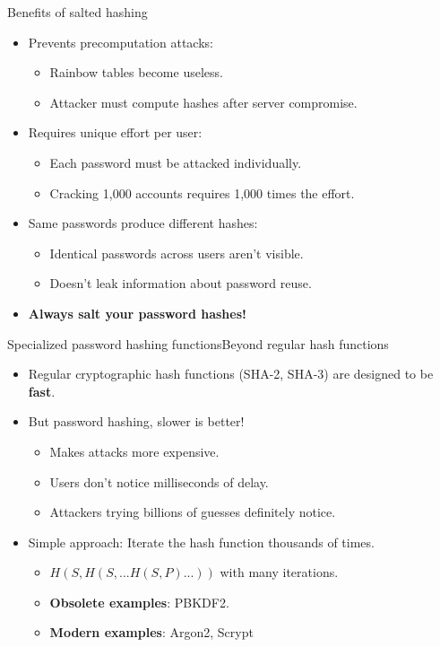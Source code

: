 \documentclass[aspectratio=169, lualatex, handout]{beamer}
\begin{document}
\begin{frame}{Benefits of salted hashing}
	\begin{itemize}[<+->]
		\item Prevents precomputation attacks:
		      \begin{itemize}
			      \item Rainbow tables become useless.
			      \item Attacker must compute hashes after server compromise.
		      \end{itemize}
		\item Requires unique effort per user:
		      \begin{itemize}
			      \item Each password must be attacked individually.
			      \item Cracking 1,000 accounts requires 1,000 times the effort.
		      \end{itemize}
		\item Same passwords produce different hashes:
		      \begin{itemize}
			      \item Identical passwords across users aren't visible.
			      \item Doesn't leak information about password reuse.
		      \end{itemize}
		\item \textbf{Always salt your password hashes!}
	\end{itemize}
\end{frame}

\begin{frame}{Specialized password hashing functions}{Beyond regular hash functions}
	\begin{itemize}[<+->]
		\item Regular cryptographic hash functions (SHA-2, SHA-3) are designed to be \textbf{fast}.
		\item But password hashing, slower is better!
		      \begin{itemize}
			      \item Makes attacks more expensive.
			      \item Users don't notice milliseconds of delay.
			      \item Attackers trying billions of guesses definitely notice.
		      \end{itemize}
		\item Simple approach: Iterate the hash function thousands of times.
		      \begin{itemize}
			      \item $H(S, H(S, ... H(S,P)...))$ with many iterations.
			      \item \textbf{Obsolete examples}: PBKDF2.
			      \item \textbf{Modern examples}: Argon2, Scrypt
		      \end{itemize}
	\end{itemize}
\end{frame}
\end{document}
